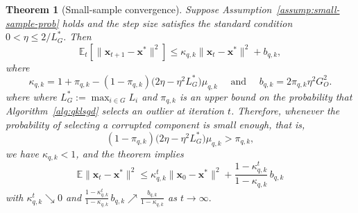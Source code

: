 \documentclass[11pt]{article}
\newcommand{\ve}[1]{\mathbf{#1}}
\newtheorem{thm}{Theorem}
\begin{document}
\begin{thm}[Small-sample convergence]
\label{thm:small-sample-prob}
Suppose Assumption~\ref{assump:small-sample-prob} holds and the step size satisfies the standard condition
$0<\eta\le 2/L_{G}^*.$
Then
\[
\mathbb{E}_t[\|\ve{x}_{t+1}-\ve{x}^*\|^2]
\le
\kappa_{q,k}\|\ve{x}_t-\ve{x}^*\|^2+b_{q,k},
\]
where
\[
\kappa_{q,k}
=
1 + \pi_{q,k}
-
(1-\pi_{q,k})
\bigl(2\eta-\eta^2L_{G}^*\bigr)\mu_{q,k}
\quad \text{ and } \quad
b_{q,k}
=
2\pi_{q,k}\eta^2G_O^2.
\]
where where \(L_G^*:=\max_{i\in G}L_i\) and \(\pi_{q,k}\) is an upper bound on the probability that
Algorithm~\ref{alg:qklsgd} selects an outlier at iteration \(t\).   Therefore, whenever the probability of selecting a corrupted component is small enough, that is,
\[
(1-\pi_{q,k})
\bigl(2\eta-\eta^2L_{G}^*\bigr)\mu_{q,k}
>
\pi_{q,k},
\]
we have \(\kappa_{q,k}<1\), and the theorem implies
\[
\mathbb{E}\|\ve{x}_t-\ve{x}^*\|^2
\le
\kappa_{q,k}^t\|\ve{x}_0-\ve{x}^*\|^2
+
\frac{1-\kappa_{q,k}^t}{1-\kappa_{q,k}}
\,b_{q,k}
\]
{with $\kappa_{q,k}^t \searrow 0$ and $\frac{1-\kappa_{q,k}^t}{1-\kappa_{q,k}}
\,b_{q,k} \nearrow \frac{b_{q,k}}{1-\kappa_{q,k}}$ as $t \rightarrow \infty.$}
\end{thm}
\end{document}
